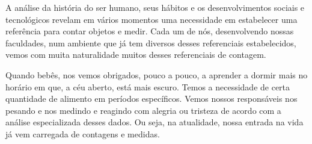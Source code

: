 A análise da história do ser humano, seus hábitos e os desenvolvimentos sociais e tecnológicos revelam em vários momentos uma necessidade em estabelecer uma referência para contar objetos e medir. Cada um de nós, desenvolvendo nossas faculdades, num ambiente que já tem diversos desses referenciais estabelecidos, vemos com muita naturalidade muitos desses referenciais de contagem.

Quando bebês, nos vemos obrigados, pouco a pouco, a aprender a dormir mais no horário em que, a céu aberto, está mais escuro. Temos a necessidade de certa quantidade de alimento em períodos específicos. Vemos nossos responsáveis nos pesando e nos medindo e reagindo com alegria ou tristeza de acordo com a análise especializada desses dados. Ou seja, na atualidade, nossa entrada na vida já vem carregada de contagens e medidas.

